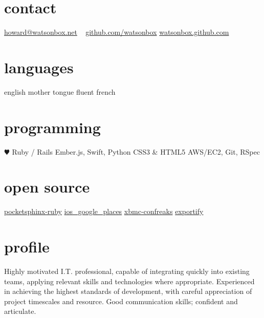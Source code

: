 \documentclass[]{friggeri-cv} %
\begin{document}


\begin{aside} %
\section{contact}
\href{mailto:howard@watsonbox.net}{howard@watsonbox.net}
~
\href{http://github.com/watsonbox}{github.com/watsonbox}
\href{http://watsonbox.github.com}{watsonbox.github.com}
\section{languages}
english mother tongue
fluent french
\section{programming}
{\color{red} $\varheartsuit$} Ruby / Rails
Ember.js, Swift, Python
CSS3 \& HTML5
AWS/EC2, Git, RSpec
\section{open source}
\href{https://github.com/watsonbox/pocketsphinx-ruby}{pocketsphinx-ruby}
\href{https://github.com/watsonbox/ios_google_places_autocomplete}{ios\_google\_places}
\href{https://github.com/watsonbox/xbmc-confreaks}{xbmc-confreaks}
\href{https://github.com/watsonbox/exportify}{exportify}
\end{aside}


\section{profile}

Highly motivated I.T. professional, capable of integrating quickly into existing teams, applying relevant skills and technologies where appropriate. Experienced in achieving the highest standards of development, with careful appreciation of project timescales and resource. Good communication skills; confident and articulate.
\end{document}
